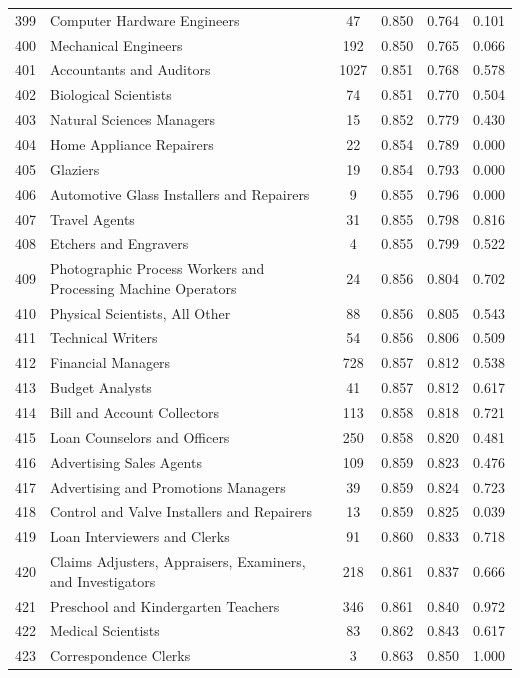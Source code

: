 {\begin{longtable}{llcccc}
 399 & Computer Hardware Engineers & 47 & 0.850 & 0.764 & 0.101 \\
 400 & Mechanical Engineers & 192 & 0.850 & 0.765 & 0.066 \\
 401 & Accountants and Auditors & 1027 & 0.851 & 0.768 & 0.578 \\
 402 & Biological Scientists & 74 & 0.851 & 0.770 & 0.504 \\
 403 & Natural Sciences Managers & 15 & 0.852 & 0.779 & 0.430 \\
 404 & Home Appliance Repairers & 22 & 0.854 & 0.789 & 0.000 \\
 405 & Glaziers & 19 & 0.854 & 0.793 & 0.000 \\
 406 & Automotive Glass Installers and Repairers & 9 & 0.855 & 0.796 & 0.000 \\
 407 & Travel Agents & 31 & 0.855 & 0.798 & 0.816 \\
 408 & Etchers and Engravers & 4 & 0.855 & 0.799 & 0.522 \\
 409 & Photographic Process Workers and Processing Machine Operators & 24 & 0.856 & 0.804 & 0.702 \\
 410 & Physical Scientists, All Other & 88 & 0.856 & 0.805 & 0.543 \\
 411 & Technical Writers & 54 & 0.856 & 0.806 & 0.509 \\
 412 & Financial Managers & 728 & 0.857 & 0.812 & 0.538 \\
 413 & Budget Analysts & 41 & 0.857 & 0.812 & 0.617 \\
 414 & Bill and Account Collectors & 113 & 0.858 & 0.818 & 0.721 \\
 415 & Loan Counselors and Officers & 250 & 0.858 & 0.820 & 0.481 \\
 416 & Advertising Sales Agents & 109 & 0.859 & 0.823 & 0.476 \\
 417 & Advertising and Promotions Managers & 39 & 0.859 & 0.824 & 0.723 \\
 418 & Control and Valve Installers and Repairers & 13 & 0.859 & 0.825 & 0.039 \\
 419 & Loan Interviewers and Clerks & 91 & 0.860 & 0.833 & 0.718 \\
 420 & Claims Adjusters, Appraisers, Examiners, and Investigators & 218 & 0.861 & 0.837 & 0.666 \\
 421 & Preschool and Kindergarten Teachers & 346 & 0.861 & 0.840 & 0.972 \\
 422 & Medical Scientists & 83 & 0.862 & 0.843 & 0.617 \\
 423 & Correspondence Clerks & 3 & 0.863 & 0.850 & 1.000 \\

\end{longtable}}
